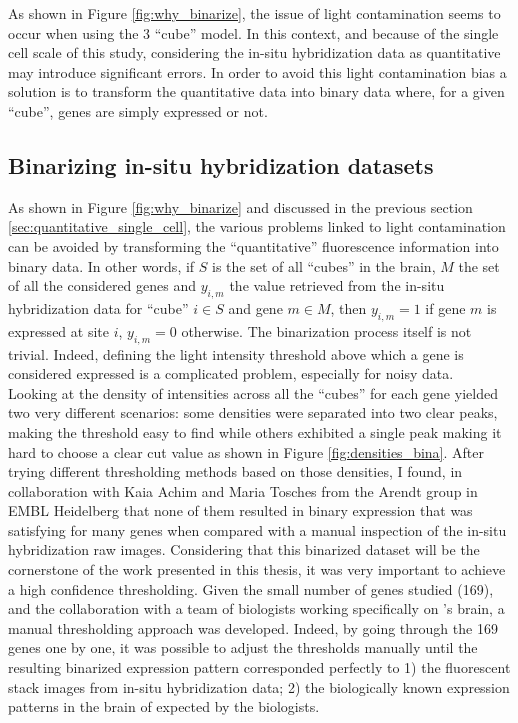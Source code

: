   As shown in Figure \ref{fig:why_binarize}, the issue of light contamination seems to occur when using the 3  ``cube'' model. In this context, and because of the single cell scale of this study, considering the in-situ hybridization data as quantitative may introduce significant errors. In order to avoid this light contamination bias a solution is to transform the quantitative data into binary data where, for a given ``cube'', genes are simply expressed or not.
  
	
  \subsection{Binarizing in-situ hybridization datasets}
	As shown in Figure \ref{fig:why_binarize} and discussed in the previous section \ref{sec:quantitative_single_cell}, the various problems linked to light contamination can be avoided by transforming the ``quantitative'' fluorescence information into binary data. In other words, if $S$ is the set of all ``cubes'' in the brain, $M$ the set of all the considered genes and $y_{i,m}$ the value retrieved from the in-situ hybridization data for ``cube'' $i \in S$ and gene $m \in M$, then  $y_{i,m} = 1$ if gene $m$ is expressed at site $i$, $y_{i,m} = 0$ otherwise. The binarization process itself is not trivial. Indeed, defining the light intensity threshold above which a gene is considered expressed is a complicated problem, especially for noisy data.\\

	Looking at the density of intensities across all the ``cubes'' for each gene yielded two very different scenarios: some densities were separated into two clear peaks, making the threshold easy to find while others exhibited a single peak making it hard to choose a clear cut value as shown in Figure \ref{fig:densities_bina}. After trying different thresholding methods based on those densities, I found, in collaboration with Kaia Achim and Maria Tosches from the Arendt group in EMBL Heidelberg that none of them resulted in binary expression that was satisfying for many genes when compared with a manual inspection of the in-situ hybridization raw images. Considering that this binarized dataset will be the cornerstone of the work presented in this thesis, it was very important to achieve a high confidence thresholding. Given the small number of genes studied (169), and the collaboration with a team of biologists working specifically on \platyfull{}'s brain, a manual thresholding approach was developed. Indeed, by going through the 169 genes one by one, it was possible to adjust the thresholds manually until the resulting binarized expression pattern corresponded perfectly to 1) the fluorescent stack images from in-situ hybridization data; 2) the biologically known expression patterns in the brain of \platy{} expected by the biologists.\\
	
